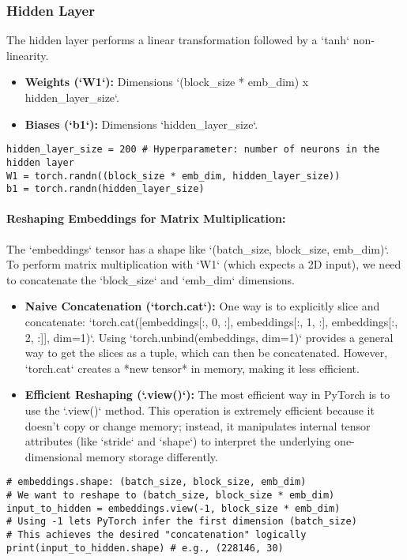 \subsubsection{Hidden Layer}
The hidden layer performs a linear transformation followed by a `tanh` non-linearity.
\begin{itemize}
    \item \textbf{Weights (`W1`):} Dimensions `(block_size * emb_dim) x hidden_layer_size`.
    \item \textbf{Biases (`b1`):} Dimensions `hidden_layer_size`.
\end{itemize}

\begin{lstlisting}[caption=Hidden Layer Parameter Initialization]
hidden_layer_size = 200 # Hyperparameter: number of neurons in the hidden layer
W1 = torch.randn((block_size * emb_dim, hidden_layer_size))
b1 = torch.randn(hidden_layer_size)
\end{lstlisting}

\paragraph{Reshaping Embeddings for Matrix Multiplication:}
The `embeddings` tensor has a shape like `(batch_size, block_size, emb_dim)`. To perform matrix multiplication with `W1` (which expects a 2D input), we need to concatenate the `block_size` and `emb_dim` dimensions.

\begin{itemize}
    \item \textbf{Naive Concatenation (`torch.cat`):}
    One way is to explicitly slice and concatenate: `torch.cat([embeddings[:, 0, :], embeddings[:, 1, :], embeddings[:, 2, :]], dim=1)`.
    Using `torch.unbind(embeddings, dim=1)` provides a general way to get the slices as a tuple, which can then be concatenated.
    However, `torch.cat` creates a *new tensor* in memory, making it less efficient.

    \item \textbf{Efficient Reshaping (`.view()`):}
    The most efficient way in PyTorch is to use the `.view()` method. This operation is extremely efficient because it doesn't copy or change memory; instead, it manipulates internal tensor attributes (like `stride` and `shape`) to interpret the underlying one-dimensional memory storage differently.
\end{itemize}

\begin{lstlisting}[caption=Efficient Embedding Reshaping with .view()]
# embeddings.shape: (batch_size, block_size, emb_dim)
# We want to reshape to (batch_size, block_size * emb_dim)
input_to_hidden = embeddings.view(-1, block_size * emb_dim)
# Using -1 lets PyTorch infer the first dimension (batch_size)
# This achieves the desired "concatenation" logically
print(input_to_hidden.shape) # e.g., (228146, 30)
\end{lstlisting}

